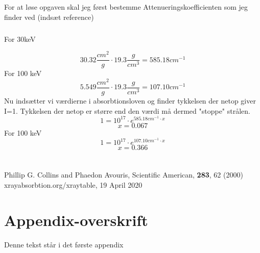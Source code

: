 \documentclass[a4paper,twoside]{article}
\begin{document}
\subsection{}
For at løse opgaven skal jeg først bestemme Attenueringskoefficienten som jeg finder ved (indsæt reference)
\subsubsection*{}For 30keV

\begin{equation*}
    30.32\frac{cm^2}{g}\cdot19.3\frac{g}{cm^3}=585.18cm^{-1}
\end{equation*}
For 100 keV
\begin{equation*}
    5.549\frac{cm^2}{g}\cdot19.3\frac{g}{cm^3}=107.10cm^{-1}
\end{equation*}
Nu indsætter vi værdierne i absorbtionsloven og finder tykkelsen der netop giver I=1. Tykkelsen der netop er større end den værdi må dermed "stoppe" strålen. 
\begin{equation*}
  1=10^{17}\cdot e^{585.18cm^{-1}\cdot x}
\end{equation*}
\begin{equation*}
    x=0.067
\end{equation*}
For 100 keV
\begin{equation*}
     1=10^{17}\cdot e^{107.10cm^{-1}\cdot x}
\end{equation*}
\begin{equation*}
    x=0.366
\end{equation*}
\newpage
\section{}
%

\begin{thebibliography}{} %
Phillip G. Collins and Phaedon Avouris, Scientific American, \textbf{283}, 62 (2000)
    xrayabsorbtion.org/xraytable, 19 April 2020
\end{thebibliography}

\newpage 

\appendix
\section{Appendix-overskrift}
Denne tekst står i det første appendix
\end{document}
